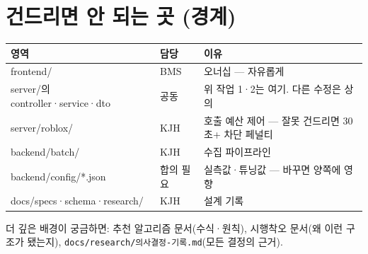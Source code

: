 \documentclass[11pt]{article}
\begin{document}
\section{건드리면 안 되는 곳 (경계)}

\begin{center}
\begin{tabular}{lll}
\toprule
영역 & 담당 & 이유 \\
\midrule
frontend/ & BMS & 오너십 --- 자유롭게 \\
server/의 controller·service·dto & 공동 & 위 작업 1·2는 여기. 다른 수정은 상의 \\
server/roblox/ & KJH & 호출 예산 제어 --- 잘못 건드리면 30초+ 차단 페널티 \\
backend/batch/ & KJH & 수집 파이프라인 \\
backend/config/*.json & 합의 필요 & 실측값·튜닝값 --- 바꾸면 양쪽에 영향 \\
docs/specs·schema·research/ & KJH & 설계 기록 \\
\bottomrule
\end{tabular}
\end{center}

\bigskip
\noindent 더 깊은 배경이 궁금하면: 추천 알고리즘 문서(수식·원칙),
시행착오 문서(왜 이런 구조가 됐는지), \texttt{docs/research/의사결정-기록.md}(모든 결정의 근거).
\end{document}
